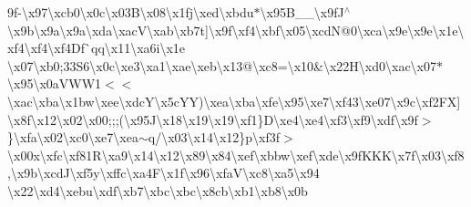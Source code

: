 9f-\/\textbackslash{}x97\textbackslash{}xcb0\textbackslash{}x0c\textbackslash{}x03\+B\textbackslash{}x08\textbackslash{}x1fj\textbackslash{}xed\textbackslash{}xbdu$\ast$\textbackslash{}x95\+B\+\_\+\+\_\+\textbackslash{}x9f\+J$^\wedge$\textbackslash{}x9b\textbackslash{}x9a\textbackslash{}x9a\textbackslash{}xda\textbackslash{}xac\+V\textbackslash{}xab\textbackslash{}xb7t\mbox{]}\textbackslash{}x9f\textbackslash{}xf4\textbackslash{}xbf\textbackslash{}x05\textbackslash{}xcd\+N@0\textbackslash{}xca\textbackslash{}x9e\textbackslash{}x9e\textbackslash{}x1e\textbackslash{}xf4\textbackslash{}xf4\textbackslash{}xf4\+Df\`{}qq\textbackslash{}x11\textbackslash{}xa6i\textbackslash{}x1e \textbackslash{}x07\textbackslash{}xb0;33\+S6\textbackslash{}x0c\textbackslash{}xe3\textbackslash{}xa1\textbackslash{}xae\textbackslash{}xeb\textbackslash{}x13@\textbackslash{}xc8=\textbackslash{}x10\&\textbackslash{}x22\+H\textbackslash{}xd0\textbackslash{}xac\textbackslash{}x07$\ast$\textbackslash{}x95\textbackslash{}x0a\+V\+W\+W1$<$$<$\textbackslash{}xac\textbackslash{}xba\textbackslash{}x1bw\textbackslash{}xee\textbackslash{}xdc\+Y\textbackslash{}x5c\+Y\+Y)\textbackslash{}xea\textbackslash{}xba\textbackslash{}xfe\textbackslash{}x95\textbackslash{}xe7\textbackslash{}xf43\textbackslash{}xe07\textbackslash{}x9c\textbackslash{}xf2\+F\+X\mbox{]}\textbackslash{}x8f\textbackslash{}x12\textbackslash{}x02\textbackslash{}x00;;;(\textbackslash{}x95\+J\textbackslash{}x18\textbackslash{}x19\textbackslash{}x19\textbackslash{}xf1\}\+D\textbackslash{}xe4\textbackslash{}xe4\textbackslash{}xf3\textbackslash{}xf9\textbackslash{}xdf\textbackslash{}x9f$>$\}\textbackslash{}xfa\textbackslash{}x02\textbackslash{}xc0\textbackslash{}xe7\textbackslash{}xea$\sim$q/\textbackslash{}x03\textbackslash{}x14\textbackslash{}x12\}p\textbackslash{}xf3f$>$\textbackslash{}x00x\textbackslash{}xfc\textbackslash{}xf81\+R\textbackslash{}xa9\textbackslash{}x14\textbackslash{}x12\textbackslash{}x89\textbackslash{}x84\textbackslash{}xef\textbackslash{}xbbw\textbackslash{}xef\textbackslash{}xde\textbackslash{}x9f\+K\+K\+K\textbackslash{}x7f\textbackslash{}x03\textbackslash{}xf8,\textbackslash{}x9b\textbackslash{}xcd\+J\textbackslash{}xf5y\textbackslash{}xffc\textbackslash{}xa4\+F\textbackslash{}x1f\textbackslash{}x96\textbackslash{}xfa\+V\textbackslash{}xc8\textbackslash{}xa5\textbackslash{}x94 \textbackslash{}x22\textbackslash{}xd4\textbackslash{}xebu\textbackslash{}xdf\textbackslash{}xb7\textbackslash{}xbc\textbackslash{}xbc\textbackslash{}x8cb\textbackslash{}xb1\textbackslash{}xb8\textbackslash{}x0b 